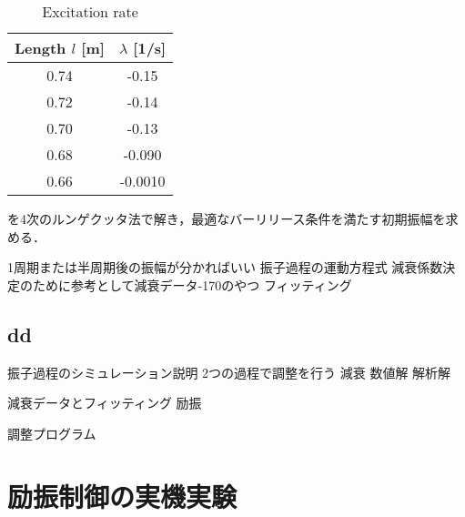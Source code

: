             \begin{table}[tb]
              \begin{center}
                \caption{Excitation rate}
                \vspace{2mm}
                \begin{tabular}{c|c}
                  \hline
                  Length $l$ [m] & $\lambda$ [1/s] \\
                  \hline
                  0.74 & -0.15 \\
                  0.72 & -0.14 \\
                  0.70 & -0.13 \\
                  0.68 & -0.090 \\
                  0.66 & -0.0010 \\                     
                  \hline
                \end{tabular}
              \end{center}
            \end{table}
            


          



          

          
          
          
          
            を4次のルンゲクッタ法で解き，最適なバーリリース条件を満たす初期振幅を求める．
          
          


          1周期または半周期後の振幅が分かればいい
          振子過程の運動方程式
          減衰係数決定のために参考として減衰データ-170のやつ
          フィッティング


          

        \subsection{dd}
        
          

        振子過程のシミュレーション説明
        2つの過程で調整を行う
          減衰
            数値解  
            解析解
            
            減衰データとフィッティング
          励振

          調整プログラム
        \section{励振制御の実機実験}



